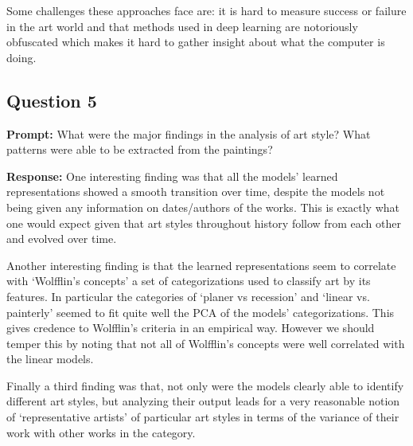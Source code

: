 \documentclass{article}
\begin{document}
Some challenges these approaches face are: it is hard to measure success or failure in the art world and that methods used in deep learning are notoriously obfuscated which makes it hard to gather insight about what the computer is doing.

\subsection*{Question 5}
\noindent\textbf{Prompt:} What were the major findings in the analysis of art style? What patterns were able to be extracted from the paintings?
\bigskip

\noindent\textbf{Response:} One interesting finding was that all the models' learned representations showed a smooth transition over time, despite the models not being given any information on dates/authors of the works. This is exactly what one would expect given that art styles throughout history follow from each other and evolved over time.

Another interesting finding is that the learned representations seem to correlate with `Wolfflin's concepts' a set of categorizations used to classify art by its features. In particular the categories of `planer vs recession' and `linear vs. painterly' seemed to fit quite well the PCA of the models' categorizations. This gives credence to Wolfflin's criteria in an empirical way. However we should temper this by noting that not all of Wolfflin's concepts were well correlated with the linear models.

Finally a third finding was that, not only were the models clearly able to identify different art styles, but analyzing their output leads for a very reasonable notion of `representative artists' of particular art styles in terms of the variance of their work with other works in the category.
\end{document}
